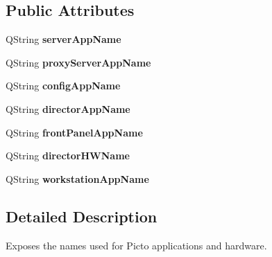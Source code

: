 \subsection*{Public Attributes}
\begin{DoxyCompactItemize}
\item 
\hypertarget{class_picto_1_1_translated_names_aff789ac80e6a2a41a49a14676c5c5277}{Q\-String {\bfseries server\-App\-Name}}\label{class_picto_1_1_translated_names_aff789ac80e6a2a41a49a14676c5c5277}

\item 
\hypertarget{class_picto_1_1_translated_names_addc6565f4cb980f1823844109e60004b}{Q\-String {\bfseries proxy\-Server\-App\-Name}}\label{class_picto_1_1_translated_names_addc6565f4cb980f1823844109e60004b}

\item 
\hypertarget{class_picto_1_1_translated_names_a251691d7c3ae0f7cbeb95ab01e743d0b}{Q\-String {\bfseries config\-App\-Name}}\label{class_picto_1_1_translated_names_a251691d7c3ae0f7cbeb95ab01e743d0b}

\item 
\hypertarget{class_picto_1_1_translated_names_a42e7827c0d22077c94a58dd4271ea919}{Q\-String {\bfseries director\-App\-Name}}\label{class_picto_1_1_translated_names_a42e7827c0d22077c94a58dd4271ea919}

\item 
\hypertarget{class_picto_1_1_translated_names_ab8fbf45d552bbf7109089b9759a4ad32}{Q\-String {\bfseries front\-Panel\-App\-Name}}\label{class_picto_1_1_translated_names_ab8fbf45d552bbf7109089b9759a4ad32}

\item 
\hypertarget{class_picto_1_1_translated_names_ace1f74d90d127bef47890c22023b5aea}{Q\-String {\bfseries director\-H\-W\-Name}}\label{class_picto_1_1_translated_names_ace1f74d90d127bef47890c22023b5aea}

\item 
\hypertarget{class_picto_1_1_translated_names_acab2415b4cf72fd32a2abf8cad4b2643}{Q\-String {\bfseries workstation\-App\-Name}}\label{class_picto_1_1_translated_names_acab2415b4cf72fd32a2abf8cad4b2643}

\end{DoxyCompactItemize}


\subsection{Detailed Description}
Exposes the names used for Picto applications and hardware. 


